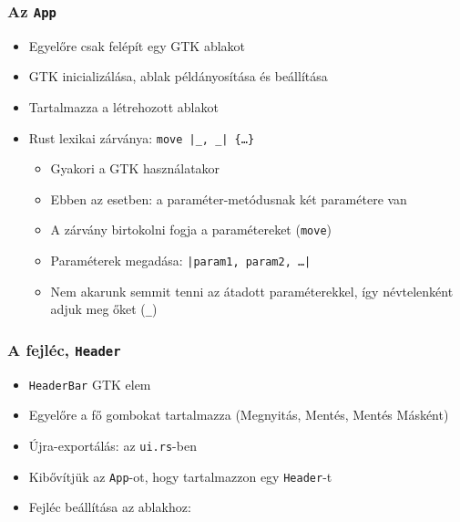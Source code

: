 \documentclass{beamer}
\begin{document}
    \begin{frame}[fragile]
        \frametitle{Az \texttt{App}}

        \begin{itemize}
            \item Egyelőre csak felépít egy GTK ablakot
            \item GTK inicializálása, ablak példányosítása és beállítása
            \item Tartalmazza a létrehozott ablakot
            \item Rust lexikai zárványa: \texttt{move |\_, \_| \{\dots\}}
            \begin{itemize}
                \item Gyakori a GTK használatakor
                \item Ebben az esetben: a paraméter-metódusnak két paramétere van
                \item A zárvány birtokolni fogja a paramétereket (\texttt{move})
                \item Paraméterek megadása: \texttt{|param1, param2, \dots|}
                \item Nem akarunk semmit tenni az átadott paraméterekkel, így névtelenként adjuk meg őket (\texttt{\_})
            \end{itemize}
        \end{itemize}
    \end{frame}

    \begin{frame}[fragile]
        \frametitle{A fejléc, \texttt{Header}}

        \begin{itemize}
            \item \texttt{HeaderBar} GTK elem
            \item Egyelőre a fő gombokat tartalmazza (Megnyitás, Mentés, Mentés Másként)
            \item Újra-exportálás:  az \texttt{ui.rs}-ben
            \item Kibővítjük az \texttt{App}-ot, hogy tartalmazzon egy \texttt{Header}-t
            \item Fejléc beállítása az ablakhoz: 
        \end{itemize}
    \end{frame}
\end{document}
